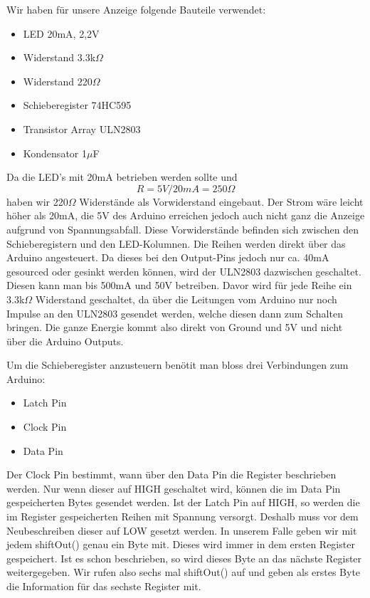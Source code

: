 \documentclass[10pt,a4paper]{article}
\begin{document}
Wir haben für unsere Anzeige folgende Bauteile verwendet:

\begin{itemize}
\item LED 20mA, 2,2V
\item Widerstand 3.3k$\Omega$
\item Widerstand 220$\Omega$
\item Schieberegister 74HC595
\item Transistor Array ULN2803
\item Kondensator 1$\mu$F
\end{itemize}

Da die LED's mit 20mA betrieben werden sollte und  \[R = 5V/20mA = 250\Omega\] haben wir 220$\Omega$ Widerstände als Vorwiderstand eingebaut. Der Strom wäre leicht höher als 20mA, die 5V des Arduino erreichen jedoch auch nicht ganz die Anzeige aufgrund von Spannungsabfall. Diese Vorwiderstände befinden sich zwischen den Schieberegistern und den LED-Kolumnen. Die Reihen werden direkt über das Arduino angesteuert. Da dieses bei den Output-Pins jedoch nur ca. 40mA gesourced oder gesinkt werden können, wird der ULN2803 dazwischen geschaltet. Diesen kann man bis 500mA und 50V betreiben. Davor wird für jede Reihe ein 3.3k$\Omega$ Widerstand geschaltet, da über die Leitungen vom Arduino nur noch Impulse an den ULN2803 gesendet werden, welche diesen dann zum Schalten bringen. Die ganze Energie kommt also direkt von Ground und 5V und nicht über die Arduino Outputs.

Um die Schieberegister anzusteuern benötit man bloss drei Verbindungen zum Arduino:
\begin{itemize}
\item Latch Pin
\item Clock Pin
\item Data Pin
\end{itemize}

Der Clock Pin bestimmt, wann über den Data Pin die Register beschrieben werden. Nur wenn dieser auf HIGH geschaltet wird, können die im Data Pin gespeicherten Bytes gesendet werden. Ist der Latch Pin auf HIGH, so werden die im Register gespeicherten Reihen mit Spannung versorgt. Deshalb muss vor dem Neubeschreiben dieser auf LOW gesetzt werden. In unserem Falle geben wir mit jedem shiftOut() genau ein Byte mit. Dieses wird immer in dem ersten Register gespeichert. Ist es schon beschrieben, so wird dieses Byte an das nächste Register weitergegeben. Wir rufen also sechs mal shiftOut() auf und geben als erstes Byte die Information für das sechste Register mit.
\end{document}
